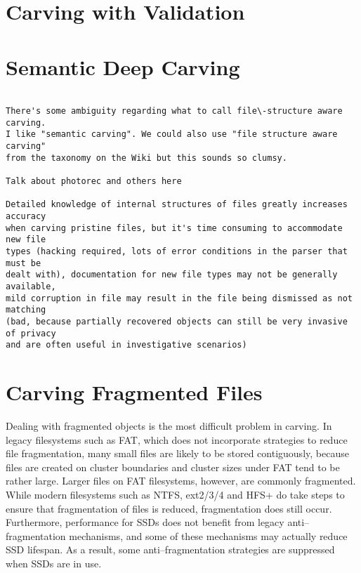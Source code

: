 \section{Carving with Validation}



\section{Semantic \/ Deep Carving}

\begin{Verbatim}

There's some ambiguity regarding what to call file\-structure aware carving. 
I like "semantic carving". We could also use "file structure aware carving" 
from the taxonomy on the Wiki but this sounds so clumsy.

Talk about photorec and others here

Detailed knowledge of internal structures of files greatly increases accuracy
when carving pristine files, but it's time consuming to accommodate new file
types (hacking required, lots of error conditions in the parser that must be 
dealt with), documentation for new file types may not be generally available, 
mild corruption in file may result in the file being dismissed as not matching
(bad, because partially recovered objects can still be very invasive of privacy
and are often useful in investigative scenarios)

\end{Verbatim}

\section{Carving Fragmented Files}

Dealing with fragmented objects is the most difficult problem in carving.  In legacy filesystems such as FAT, which does not incorporate strategies to reduce file fragmentation, many small files are likely to be stored contiguously, because files are created on cluster boundaries and cluster sizes under FAT tend to be rather large.  Larger files on FAT filesystems, however, are commonly fragmented\cite{Simson-DFRWS-2007-relevant-here?}.  While modern filesystems such as NTFS, ext2/3/4 and HFS+ do take steps to ensure that fragmentation of files is reduced, fragmentation does still occur.  Furthermore, performance for SSDs does not benefit from legacy anti--fragmentation mechanisms, and some of these mechanisms may actually reduce SSD lifespan.  As a result, some anti--fragmentation strategies are suppressed when SSDs are in use.  

